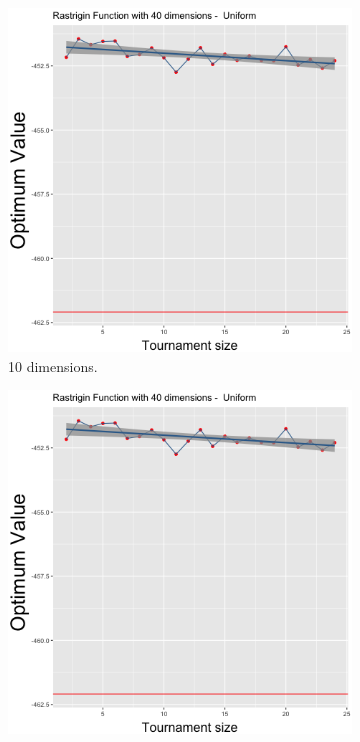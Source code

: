 \begin{figure}[t]
	\begin{subfigure}[b]{0.33\textwidth}
		\centering
		\includegraphics[width=\textwidth]{img/multimodal_uniform_3_dim_40.png}
		\caption{10 dimensions.}
	\end{subfigure}
	\begin{subfigure}[b]{0.33\textwidth}
		\centering
		\includegraphics[width=\textwidth]{img/multimodal_uniform_3_dim_40.png}

\end{subfigure}
\end{figure}
